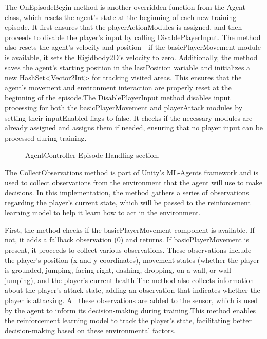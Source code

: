 \documentclass[12pt,oneside,openright,a4paper]{cpe-english-project}
\begin{document}
The OnEpisodeBegin method is another overridden function from the Agent class, which resets the agent’s state at the beginning of each new training episode. It first ensures that the playerActionModules is assigned, and then proceeds to disable the player’s input by calling DisablePlayerInput. The method also resets the agent's velocity and position—if the basicPlayerMovement module is available, it sets the Rigidbody2D's velocity to zero. Additionally, the method saves the agent's starting position in the lastPosition variable and initializes a new HashSet<Vector2Int> for tracking visited areas. This ensures that the agent’s movement and environment interaction are properly reset at the beginning of the episode.The DisablePlayerInput method disables input processing for both the basicPlayerMovement and playerAttack modules by setting their inputEnabled flags to false. It checks if the necessary modules are already assigned and assigns them if needed, ensuring that no player input can be processed during training.\par
 \begin{figure}[!h]
 \centering
\caption{AgentController Episode Handling section.}\label{fig:Epihand}
\end{figure}
\newpage
The CollectObservations method is part of Unity's ML-Agents framework and is used to collect observations from the environment that the agent will use to make decisions. In this implementation, the method gathers a series of observations regarding the player's current state, which will be passed to the reinforcement learning model to help it learn how to act in the environment.\par
First, the method checks if the basicPlayerMovement component is available. If not, it adds a fallback observation (0) and returns. If basicPlayerMovement is present, it proceeds to collect various observations. These observations include the player’s position (x and y coordinates), movement states (whether the player is grounded, jumping, facing right, dashing, dropping, on a wall, or wall-jumping), and the player’s current health.The method also collects information about the player's attack state, adding an observation that indicates whether the player is attacking. All these observations are added to the sensor, which is used by the agent to inform its decision-making during training.This method enables the reinforcement learning model to track the player's state, facilitating better decision-making based on these environmental factors.\par
\end{document}
